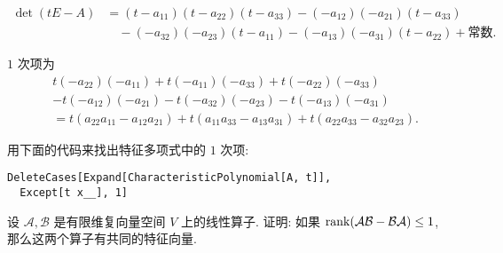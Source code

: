 \documentclass[color=black,device=normal,lang=cn,mode=geye]{elegantnote}
\begin{document}
\begin{solution}
    \begin{align*}
        \det(tE-A) & =(t-a_{11})(t-a_{22})(t-a_{33})-(-a_{12})(-a_{21})(t-a_{33}) \\
        & \quad-(-a_{32})(-a_{23})(t-a_{11})-(-a_{13})(-a_{31})(t-a_{22})+\text{常数}.
    \end{align*}

    $1$ 次项为
    \begin{align*}
        & t(-a_{22})(-a_{11})+t(-a_{11})(-a_{33})+t(-a_{22})(-a_{33}) \\
        & -t(-a_{12})(-a_{21})-t(-a_{32})(-a_{23})-t(-a_{13})(-a_{31}) \\
        & =t(a_{22}a_{11}-a_{12}a_{21})+t(a_{11}a_{33}-a_{13}a_{31})+t(a_{22}a_{33}-a_{32}a_{23}).
    \end{align*}
\end{solution}
\begin{note}
    用下面的代码来找出特征多项式中的 $1$ 次项:
    \begin{lstlisting}
DeleteCases[Expand[CharacteristicPolynomial[A, t]], 
  Except[t x__], 1]
    \end{lstlisting}
\end{note}
\begin{exercisec}[2.3.24]
    设 $\mathcal{A},\mathcal{B}$ 是有限维复向量空间 $V$ 上的线性算子. 证明: 如果 $\operatorname{rank}(\mathcal{AB}-\mathcal{BA})\leq1$, 那么这两个算子有共同的特征向量.
\end{exercisec}
\end{document}
